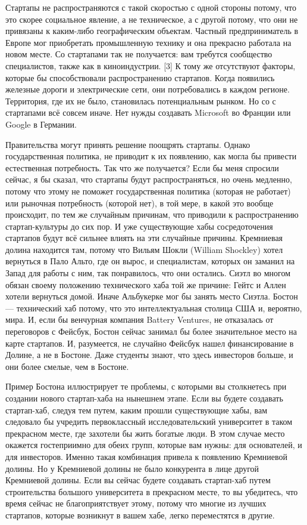 \documentclass[ebook,12pt,oneside,openany]{memoir}
\begin{document}
Стартапы не распространяются с такой скоростью с одной стороны потому,
что это скорее социальное явление, а не техническое, а с другой
потому, что они не привязаны к каким-либо географическим объектам.
Частный предприниматель в Европе мог приобретать промышленную технику
и она прекрасно работала на новом месте. Со стартапами так не
получается: вам требутся сообщество специалистов, также как в
киноиндустрии. [3] К тому же отсутствуют факторы, которые бы
способствовали распространению стартапов. Когда появились железные
дороги и электрические сети, они потребовались в каждом регионе.
Территория, где их не было, становилась потенциальным рынком. Но со с
стартапами всё совсем иначе. Нет нужды создавать Microsoft во Франции
или Google в Германии.

Правительства могут принять решение поощрять стартапы. Однако
государственная политика, не приводит к их появлению, как могла бы
привести естественная потребность. Так что же получается? Если бы меня
спросили сейчас, я бы сказал, что стартапы будут распространяться, но
очень медленно, потому что этому не поможет государственная политика
(которая не работает) или рыночная потребность (которой нет), в той
мере, в какой это вообще происходит, по тем же случайным причинам, что
приводили к распространению стартап-культуры до сих пор. И уже
существующие хабы сосредоточения стартапов будут всё сильнее влиять на
эти случайные причины. Кремниевая долина находится там, потому что
Вильям Шокли (William Shockley) хотел вернуться в Пало Альто, где он
вырос, и специалистам, которых он заманил на Запад для работы с ним,
так понравилось, что они остались. Сиэтл во многом обязан своему
положению технического хаба той же причине: Гейтс и Аллен хотели
вернуться домой. Иначе Альбукерке мог бы занять место Сиэтла. Бостон —
технический хаб потому, что это интеллектуальная столица США и,
вероятно, мира. И, если бы венчурная компания Battery Ventures, не
отказалась от переговоров с Фейсбук, Бостон сейчас занимал бы более
значительное место на карте стартапов. И, разумеется, не случайно
Фейсбук нашел финансирование в Долине, а не в Бостоне. Даже студенты
знают, что здесь инвесторов больше, и они более смелые, чем в Бостоне.

Пример Бостона иллюстрирует те проблемы, с которыми вы столкнетесь при
создании нового стартап-хаба на нынешнем этапе. Если вы будете
создавать стартап-хаб, следуя тем путем, каким прошли существующие
хабы, вам следовало бы учредить первоклассный исследовательский
университет в таком прекрасном месте, где захотели бы жить богатые
люди. В этом случае место окажется гостеприимно для обеих групп,
которые вам нужны: для основателей, и для инвесторов. Именно такая
комбинация привела к появлению Кремниевой долины. Но у Кремниевой
долины не было конкурента в лице другой Кремниевой долины. Если вы
сейчас будете создавать стартап-хаб путем строительства большого
университета в прекрасном месте, то вы убедитесь, что время сейчас не
благоприятствует этому, потому что многие из лучших стартапов, которые
возникнут в вашем хабе, легко переместятся в другие.
\end{document}
